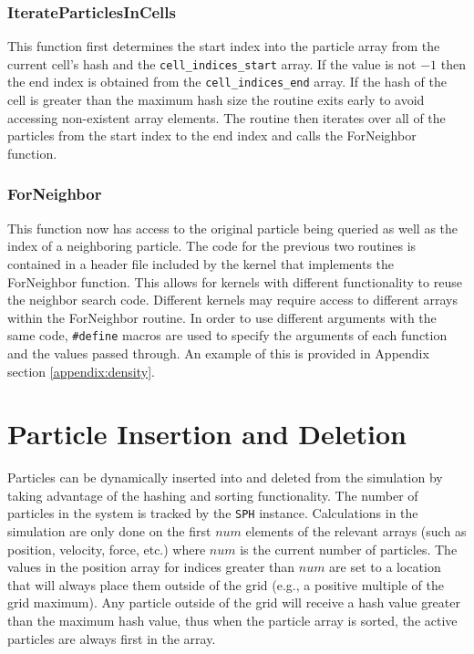 \subsubsection{IterateParticlesInCells}
This function first determines the start index into the particle array from the
current cell's hash and the \verb|cell_indices_start| array. If the value is
not $-1$ then the end index is obtained from the \verb|cell_indices_end| array.
If the hash of the cell is greater than the maximum hash size the routine exits
early to avoid accessing non-existent array elements. The routine then iterates
over all of the particles from the start index to the end index and calls the
ForNeighbor function.

\subsubsection{ForNeighbor}
This function now has access to the original particle being queried as well as
the index of a neighboring particle. The code for the previous two routines is
contained in a header file included by the kernel that implements the
ForNeighbor function. This allows for kernels with different functionality to
reuse the neighbor search code. Different kernels may require access to
different arrays within the ForNeighbor routine. In order to use different
arguments with the same code, \verb|#define| macros are used to specify
the arguments of each function and the values passed through. An example of
this is provided in Appendix section \ref{appendix:density}.

\section{Particle Insertion and Deletion}
Particles can be dynamically inserted into and deleted from the simulation by
taking advantage of the hashing and sorting functionality. The number of
particles in the system is tracked by the \verb|SPH| instance.
Calculations in the simulation are only done on the first $num$ elements of the
relevant arrays (such as position, velocity, force, etc.) where $num$ is the
current number of particles. The values in the position array for indices
greater than $num$ are set to a location that will always place them outside of
the grid (e.g., a positive multiple of the grid maximum). Any particle outside of
the grid will receive a hash value greater than the maximum hash value, thus
when the particle array is sorted, the active particles are always first in the
array. 

